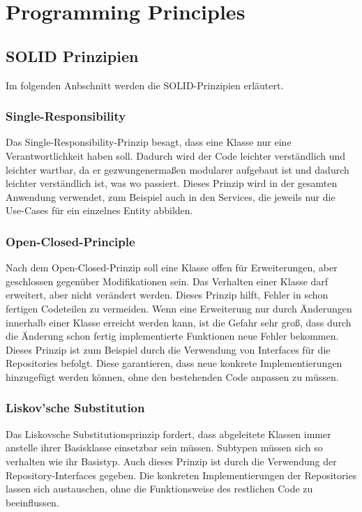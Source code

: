 \chapter{Programming Principles}

\section{SOLID Prinzipien}
Im folgenden Anbschnitt werden die SOLID-Prinzipien erläutert.
\subsection{Single-Responsibility}
Das Single-Responsibility-Prinzip besagt, dass eine Klasse nur eine Verantwortlichkeit haben soll. Dadurch wird der Code leichter verständlich und leichter wartbar, da er gezwungenermaßen modularer aufgebaut ist und dadurch leichter verständlich ist, was wo passiert. Dieses Prinzip wird in der gesamten Anwendung verwendet, zum Beispiel auch in den Services, die jeweils nur die Use-Cases für ein einzelnes Entity abbilden.

\subsection{Open-Closed-Principle}
Nach dem Open-Closed-Prinzip soll eine Klasse offen für Erweiterungen, aber geschlossen gegenüber Modifikationen sein. Das Verhalten einer Klasse darf erweitert, aber nicht verändert werden. Dieses Prinzip hilft, Fehler in schon fertigen Codeteilen zu vermeiden. Wenn eine Erweiterung nur durch Änderungen innerhalb einer Klasse erreicht werden kann, ist die Gefahr sehr groß, dass durch die Änderung schon fertig implementierte Funktionen neue Fehler bekommen. Dieses Prinzip ist zum Beispiel durch die Verwendung von Interfaces für die Repositories befolgt. Diese garantieren, dass neue konkrete Implementierungen hinzugefügt werden können, ohne den bestehenden Code anpassen zu müssen.
\subsection{Liskov'sche Substitution}
Das Liskovsche Substitutionsprinzip fordert, dass abgeleitete Klassen immer anstelle ihrer Basisklasse einsetzbar sein müssen. Subtypen müssen sich so verhalten wie ihr Basistyp. Auch dieses Prinzip ist durch die Verwendung der Repository-Interfaces gegeben. Die konkreten Implementierungen der Repositories lassen sich austauschen, ohne die Funktionsweise des restlichen Code zu beeinflussen.
